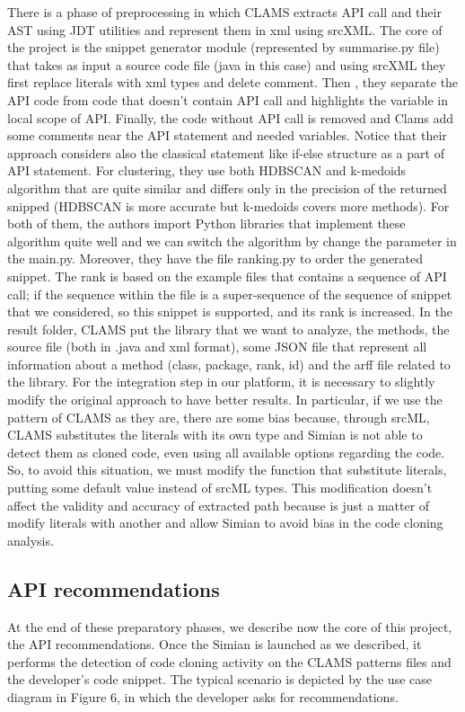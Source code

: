 There is a phase of preprocessing in which CLAMS extracts API call and their AST using JDT utilities and represent them in xml using srcXML. The core of the project is the snippet generator module (represented by summarise.py file) that takes as input a source code file (java in this case) and using srcXML they first replace literals with xml types and delete comment. Then , they separate the API code from code that doesn't contain API call and highlights the variable in local scope of API. Finally, the code without API call is removed and Clams add some comments near the API statement and needed variables. Notice that their approach considers also the classical statement like if-else structure as a part of API statement. For clustering, they use both HDBSCAN and k-medoids algorithm that are quite similar and differs only in the precision of the returned snipped (HDBSCAN is more accurate but k-medoids covers more methods). For both of them, the authors import Python libraries that implement these algorithm quite well and we can switch the algorithm by change the parameter in the main.py. Moreover, they have the file ranking.py to order the generated snippet. The rank is based on the example files that contains a sequence of API call; if the sequence within the file is a super-sequence of the sequence of snippet that we considered, so this snippet is supported, and its rank is increased. In the result folder, CLAMS put the library that we want to analyze, the methods, the source file (both in .java and xml format), some JSON file that represent all information about a method (class, package, rank, id) and the arff file related to the library. \newline
For the integration step in our platform, it is necessary to slightly modify the original approach to have better results. In particular, if we use the pattern of CLAMS as they are, there are some bias because, through srcML, CLAMS substitutes the literals with its own type and Simian is not able to detect them as cloned code, even using all available options regarding the code. So, to avoid this situation, we must modify the function that substitute literals, putting some default value instead of srcML types. This modification doesn't affect the validity and accuracy of extracted path because is just a matter of modify literals with another and allow Simian to avoid bias in the code cloning analysis.

\subsection{API recommendations}
At the end of these preparatory phases, we describe now the core of this project, the API recommendations. Once the Simian is launched as we described, it performs the detection of code cloning activity on the CLAMS patterns files and the developer's code snippet. The typical scenario is depicted by the use case diagram in Figure 6, in which the developer asks for recommendations.


